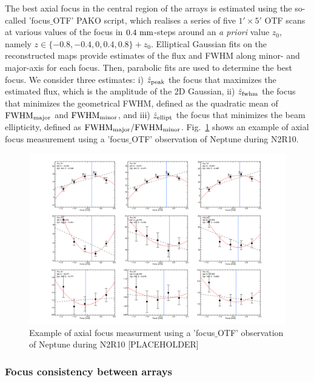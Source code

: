 The best axial focus in the central region of the arrays is estimated
using the so-called 'focus$\_$OTF' PAKO script, which realises a
series of five $1' \times 5'$ OTF scans at various values of
the focus in $0.4~\rm{mm}$-steps around an \emph{a priori} value $z_0$,
namely $z \in \{-0.8, -0.4, 0, 0.4, 0.8\} + z_0$. Elliptical Gaussian
fits on the reconstructed maps provide estimates of the flux and FWHM
along minor- and major-axis for each focus. Then, parabolic fits are
used to determine the best focus. We consider three estimates: i)
$\hat z_{\rm{peak}}$ the focus that maximizes the estimated flux,
which is the amplitude of the 2D Gaussian, 
ii) $\hat z_{\rm{fwhm}}$ the focus that
minimizes the geometrical FWHM, defined as the quadratic mean of
$\rm{FWHM}_{\rm{major}}$ and $\rm{FWHM}_{\rm{minor}}$,  and iii)
$\hat z_{\rm{ellipt}}$ the focus that minimizes the beam ellipticity,
defined as $\rm{FWHM}_{\rm{major}}/\rm{FWHM}_{\rm{minor}}$.
Fig.~\ref{fig:focus-example} shows an example of
axial focus measurement using a 'focus$\_$OTF' observation of Neptune
during N2R10.

\begin{figure}
\begin{center}
  \includegraphics[clip, angle=0, scale=0.25]{Figures/plot_20170419s143.png}
\caption{Example of axial focus measurment using a 'focus$\_$OTF' observation of Neptune
during N2R10 [PLACEHOLDER]}
\label{fig:focus-example}
\end{center}
\end{figure}


\subsubsection{Focus consistency between arrays}

